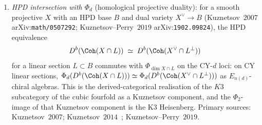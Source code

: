 \begin{remark}
\begin{enumerate}[label=\textup{(\roman*)}]
 \item \emph{HPD intersection with $\Phi_d$} (homological projective duality): for a smooth projective $X$ with an HPD base $B$ and dual variety $X^\vee \to B$ (Kuznetsov~$2007$ arXiv:\texttt{math/0507292}; Kuznetsov--Perry~$2019$ arXiv:\texttt{1902.09824}), the HPD equivalence
 \[
 D^b(\Coh(X \cap L)) \;\simeq\; D^b(\Coh(X^\vee \cap L^\perp))
 \]
 for a linear section $L \subset B$ commutes with $\Phi_{\dim X \cap L}$ on the CY-$d$ loci: on CY linear sections, $\Phi_d(D^b(\Coh(X \cap L))) \simeq \Phi_d(D^b(\Coh(X^\vee \cap L^\perp)))$ as $E_{n(d)}$-chiral algebras. This is the derived-categorical realisation of the $K3$ subcategory of the cubic fourfold as a Kuznetsov component, and the $\Phi_2$-image of that Kuznetsov component is the K3 Heisenberg. Primary sources: Kuznetsov~$2007$; Kuznetsov~$2014$~\cite{Kuznetsov2014}; Kuznetsov--Perry~$2019$.
\end{enumerate}
\end{remark}

